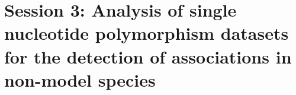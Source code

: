 \section[Session 3]{Session 3: Analysis of single nucleotide polymorphism
datasets for the detection of associations in non-model species}

\begin{frame}

\end{frame}